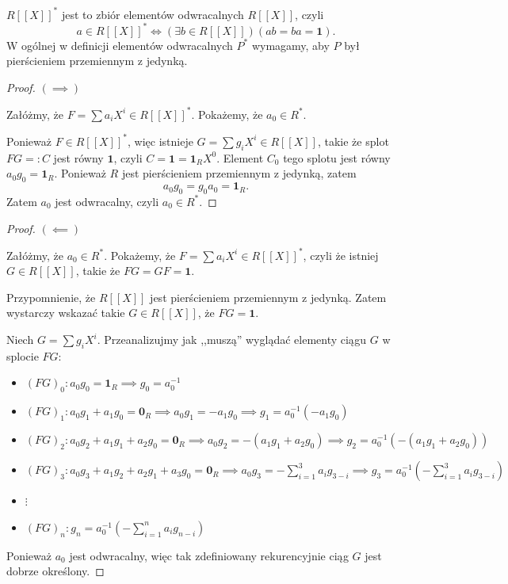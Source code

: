 \begin{solution}
	$R\left[ \left[ X \right]  \right] ^{\ast} $ jest to zbiór elementów odwracalnych $R\left[ \left[ X \right]  \right] $, czyli
	\[
	a \in R\left[ \left[ X \right]  \right]^{\ast}  \iff \left(\exists b \in R\left[ \left[ X \right]  \right]  \right)\left( ab = ba = \mathbf{1} \right)  
	.\] 
	W ogólnej w definicji elementów odwracalnych $P^{\ast} $ wymagamy, aby $P$ był pierścieniem przemiennym z jedynką.

	\begin{proof}
		$\bm{ \left( \implies \right)  } $ 

		Załóżmy, że $F = \sum a_{i}X^{i} \in R\left[ \left[ X \right]  \right] ^{\ast} $. Pokażemy, że $a_0\in R^{\ast} $.

                Ponieważ $F \in R\left[ \left[ X \right]  \right] ^{\ast} $, więc istnieje $G = \sum g_{i}X^{i} \in R\left[ \left[ X \right]  \right] $, takie że splot $FG =: C$ jest równy $\mathbf{1}$, czyli $C = \mathbf{1} = \mathbf{1}_{R}X^{0}$. Element $C_{0}$ tego splotu jest równy $a_{0}g_{0} = \mathbf{1}_{R}$. Ponieważ $R$ jest pierścieniem przemiennym z jedynką, zatem
		\[
		a_0g_0 = g_0a_0 = \mathbf{1}_{R}
		.\] 
		Zatem $a_{0}$ jest odwracalny, czyli $a_0\in R^{\ast} $.
	\end{proof} 
	\begin{proof}
		$\bm{ \left( \impliedby \right) } $ 

		Załóżmy, że $a_0 \in R^{\ast} $. Pokażemy, że $F = \sum a_{i}X^{i} \in R\left[ \left[ X \right]  \right] ^{\ast} $, czyli że istniej $G\in R\left[ \left[ X \right]  \right] $, takie że $FG = GF = \mathbf{1}$.

		Przypomnienie, że $R\left[ \left[ X \right]  \right] $ jest pierścieniem przemiennym z jedynką. Zatem wystarczy wskazać takie $G \in R\left[ \left[ X \right]  \right] $, że $FG = \mathbf{1}$.

		Niech $G = \sum g_{i}X^{i}$. Przeanalizujmy jak ,,muszą'' wyglądać elementy ciągu $G$ w splocie $FG$:
		 \begin{itemize}
			\item $(FG)_0: a_0g_0 = \mathbf{1}_{R} \implies g_0 = a_0^{-1}$
			\item $(FG)_1: a_0g_1 + a_1g_0 = \mathbf{0}_{R} \implies a_0g_1 = -a_1g_0 \implies g_1 = a_0^{-1} \left( -a_1g_0 \right) $
			\item $(FG)_2: a_0g_2 + a_1g_1 + a_2g_0 = \mathbf{0}_{R} \implies a_0g_2 = -\left( a_1g_1+a_2g_0 \right) \implies g_2 = a_0^{-1}\left( -\left( a_1g_1 + a_2g_0 \right)  \right) $
			\item $(FG)_3: a_0g_3 + a_1g_2 + a_2g_1 + a_3g_0 = \mathbf{0}_{R} \implies a_0g_3 = - \sum_{i=1}^{3} a_{i}g_{3-i} \implies g_3 = a_0^{-1}\left( - \sum_{i=1}^{3} a_{i}g_{3-i} \right) $ 
			\item $\vdots$
			 \item $(FG)_{n} : g_{n} = a_0^{-1}\left( - \sum_{i=1}^{n} a_{i}g_{n-i} \right) $
		\end{itemize}
		Ponieważ $a_0$ jest odwracalny, więc tak zdefiniowany rekurencyjnie ciąg $G$ jest dobrze określony.


\end{proof}
\end{solution}
